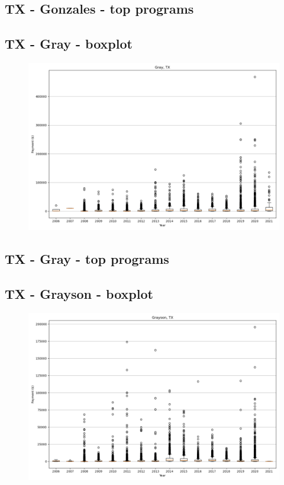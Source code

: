 \subsection*{TX - Gonzales - top programs}

\newpage
\subsection*{TX - Gray - boxplot}
\begin{figure}[h]
\centering
\includegraphics[width=7in]{../output/boxplots/counties/Gray-TX_boxplot.png}
\end{figure}


\subsection*{TX - Gray - top programs}

\newpage
\subsection*{TX - Grayson - boxplot}
\begin{figure}[h]
\centering
\includegraphics[width=7in]{../output/boxplots/counties/Grayson-TX_boxplot.png}
\end{figure}


